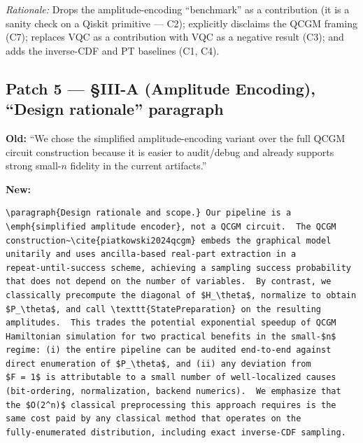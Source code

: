 \noindent\emph{Rationale:} Drops the amplitude-encoding ``benchmark'' as
a contribution (it is a sanity check on a Qiskit primitive --- C2);
explicitly disclaims the QCGM framing (C7); replaces VQC as a contribution
with VQC as a negative result (C3); and adds the inverse-CDF and PT
baselines (C1, C4).

\subsection*{Patch 5 --- \S III-A (Amplitude Encoding), ``Design rationale''
paragraph}

\textbf{Old:} ``We chose the simplified amplitude-encoding variant over the
full QCGM circuit construction because it is easier to audit/debug and
already supports strong small-$n$ fidelity in the current artifacts.''

\noindent\textbf{New:}

\begin{verbatim}
\paragraph{Design rationale and scope.} Our pipeline is a
\emph{simplified amplitude encoder}, not a QCGM circuit.  The QCGM
construction~\cite{piatkowski2024qcgm} embeds the graphical model
unitarily and uses ancilla-based real-part extraction in a
repeat-until-success scheme, achieving a sampling success probability
that does not depend on the number of variables.  By contrast, we
classically precompute the diagonal of $H_\theta$, normalize to obtain
$P_\theta$, and call \texttt{StatePreparation} on the resulting
amplitudes.  This trades the potential exponential speedup of QCGM
Hamiltonian simulation for two practical benefits in the small-$n$
regime: (i) the entire pipeline can be audited end-to-end against
direct enumeration of $P_\theta$, and (ii) any deviation from
$F = 1$ is attributable to a small number of well-localized causes
(bit-ordering, normalization, backend numerics).  We emphasize that
the $O(2^n)$ classical preprocessing this approach requires is the
same cost paid by any classical method that operates on the
fully-enumerated distribution, including exact inverse-CDF sampling.
\end{verbatim}

